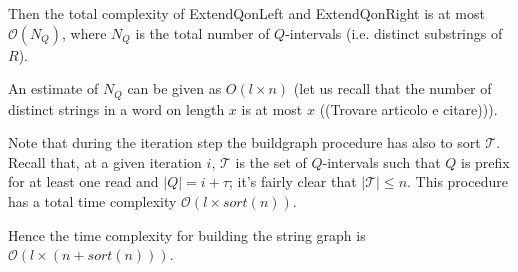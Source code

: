 \documentclass[11pt]{article}
\begin{document}
Then the total  complexity of ExtendQonLeft and ExtendQonRight is at most $\mathcal{O}(N_Q)$, where $N_Q$ is the total number of $Q$-intervals (i.e. distinct substrings of $R$).

An estimate of $N_Q$ can be given as $O(l \times n)$ (let us recall that the number of distinct strings in a word on length $x$ is  at most $x$  ((Trovare articolo e citare))).

Note that during the iteration step the buildgraph procedure has also to sort $\mathcal{T}$. Recall that, at a given iteration $i$, $\mathcal{T}$ is the set of $Q$-intervals such that $Q$ is prefix for at least one read and $|Q| = i + \tau$; it's fairly clear that $|\mathcal{T}| \leq n$. This procedure has a total time complexity $\mathcal{O}(l \times sort(n))$.

Hence the time complexity for building the string graph is $\mathcal{O}(l \times (n + sort(n)))$. %


\end{document}
